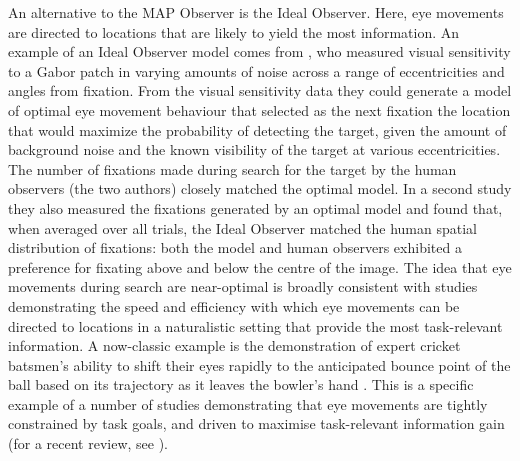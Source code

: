 \documentclass[preprint, authoryear]{elsarticle} %
\begin{document}
An alternative to the MAP Observer is the Ideal Observer. Here, eye movements are directed to locations that are likely to yield the most information. An example of an Ideal Observer model comes from \cite{najemnik-geisler2005}, who measured visual sensitivity to a Gabor patch in varying amounts of noise across a range of eccentricities and angles from fixation. From the visual sensitivity data they could generate a model of optimal eye movement behaviour that selected as the next fixation the location that would maximize the probability of detecting the target, given the amount of background noise and the known visibility of the target at various eccentricities. The number of fixations made during search for the target by the human observers (the two authors) closely matched the optimal model. In a second study \citep{najemnik-geisler2008} they also measured the fixations generated by an optimal model and found that, when averaged over all trials, the Ideal Observer matched the human spatial distribution of fixations: both the model and human observers exhibited a preference for fixating above and below the centre of the image. The idea that eye movements during search are near-optimal is broadly consistent with studies demonstrating the speed and efficiency with which eye movements can be directed to locations in a naturalistic setting that provide the most task-relevant information. A now-classic example is the demonstration of expert cricket batsmen's ability to shift their eyes rapidly to the anticipated bounce point of the ball based on its trajectory as it leaves the bowler's hand \citep{land2000}. This is a specific example of a number of studies demonstrating that eye movements are tightly constrained by task goals, and driven to maximise task-relevant information gain (for a recent review, see \citet{hayhoe2014}). 

\par
\end{document}
